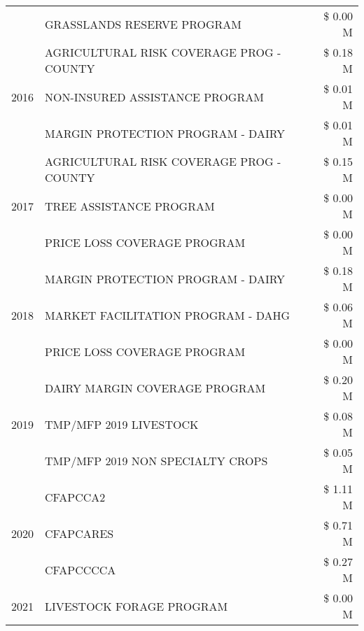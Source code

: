 \begin{tabular}{llr}
 & GRASSLANDS RESERVE PROGRAM & \$ 0.00 M \\
\cline{1-3}
\multirow[t]{3}{*}{2016} & AGRICULTURAL RISK COVERAGE PROG - COUNTY & \$ 0.18 M \\
 & NON-INSURED ASSISTANCE PROGRAM & \$ 0.01 M \\
 & MARGIN PROTECTION PROGRAM - DAIRY & \$ 0.01 M \\
\cline{1-3}
\multirow[t]{3}{*}{2017} & AGRICULTURAL RISK COVERAGE PROG - COUNTY & \$ 0.15 M \\
 & TREE ASSISTANCE PROGRAM & \$ 0.00 M \\
 & PRICE LOSS COVERAGE PROGRAM & \$ 0.00 M \\
\cline{1-3}
\multirow[t]{3}{*}{2018} & MARGIN PROTECTION PROGRAM - DAIRY & \$ 0.18 M \\
 & MARKET FACILITATION PROGRAM - DAHG & \$ 0.06 M \\
 & PRICE LOSS COVERAGE PROGRAM & \$ 0.00 M \\
\cline{1-3}
\multirow[t]{3}{*}{2019} & DAIRY MARGIN COVERAGE PROGRAM & \$ 0.20 M \\
 & TMP/MFP 2019 LIVESTOCK & \$ 0.08 M \\
 & TMP/MFP 2019 NON SPECIALTY CROPS & \$ 0.05 M \\
\cline{1-3}
\multirow[t]{3}{*}{2020} & CFAPCCA2 & \$ 1.11 M \\
 & CFAPCARES & \$ 0.71 M \\
 & CFAPCCCCA & \$ 0.27 M \\
\cline{1-3}
2021 & LIVESTOCK FORAGE PROGRAM & \$ 0.00 M \\
\cline{1-3}
\bottomrule
\end{tabular}
